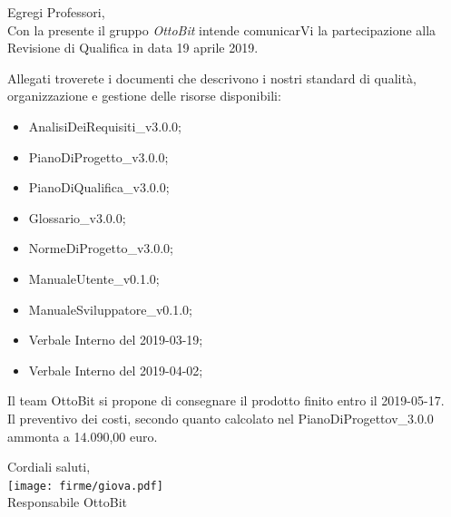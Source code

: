 \documentclass[11pt,a4paper]{article}
\begin{document}
\begin{minipage}{0.95\textwidth}
Egregi Professori,\\
Con la presente il gruppo \textit{OttoBit} intende comunicarVi la partecipazione alla Revisione di Qualifica in data 19 aprile 2019.

Allegati troverete i documenti che descrivono i nostri standard di qualità, organizzazione e gestione delle risorse disponibili:

\begin{itemize}
	\item AnalisiDeiRequisiti\_v3.0.0;
	\item PianoDiProgetto\_v3.0.0;
	\item PianoDiQualifica\_v3.0.0;
	\item Glossario\_v3.0.0;
	\item NormeDiProgetto\_v3.0.0;
	\item ManualeUtente\_v0.1.0;
	\item ManualeSviluppatore\_v0.1.0;
	\item Verbale Interno del 2019-03-19;
	\item Verbale Interno del 2019-04-02;
\end{itemize}

Il team OttoBit si propone di consegnare il prodotto finito entro il 2019-05-17.\\
Il preventivo dei costi, secondo quanto calcolato nel PianoDiProgettov\_3.0.0 ammonta a 14.090,00 euro.

\end{minipage}

	\hfill
	\begin{minipage}{0.3\textwidth}\raggedleft
	\vspace{4em}
	Cordiali saluti,\\
	\vspace{1em}
	\texttt{[image: firme/giova.pdf]}
	\\Responsabile OttoBit
	
\end{minipage}
\end{document}
